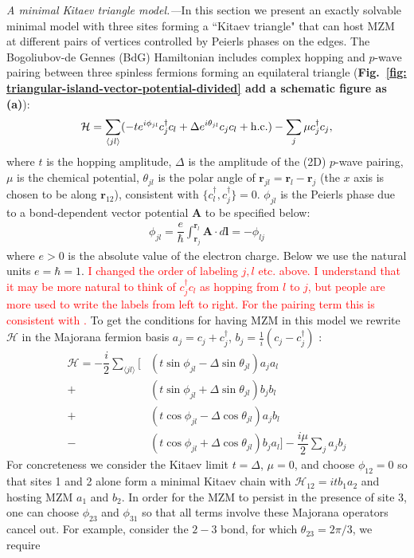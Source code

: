 \documentclass[aps,prb,showpacs,amsmath,twocolumn,amssymb,superscriptaddress]{revtex4-2}
\newcommand{\Red}[1]{\textcolor{red}{#1}}
\renewcommand{\vec}[1]{\mathbf{#1}}
\newcommand{\ham}{\mathcal{H}}
\newcommand{\cc}{c^{\dagger}}
\newcommand{\de}{\Delta}
\begin{document}
\emph{A minimal Kitaev triangle model.---}In this section we present an exactly solvable minimal model with three sites forming a ``Kitaev triangle" that can host MZM at different pairs of vertices controlled by Peierls phases on the edges. The Bogoliubov-de Gennes (BdG) Hamiltonian includes complex hopping and $p$-wave pairing between three spinless fermions forming an equilateral triangle ({\bf Fig.~\ref{fig: triangular-island-vector-potential-divided} add a schematic figure as (a)}):
\begin{equation}\label{eq:HBdG}
  \ham = \sum_{\langle j l \rangle} (-te^{i\phi_{jl}}\cc_{j} c_l + \de e^{i\theta_{jl}} c_{j} c_l + {\rm h.c.}) - \sum_{j} \mu \cc_j c_j,
\end{equation}
where $t$ is the hopping amplitude, $\de$ is the amplitude of the (2D) $p$-wave pairing, $\mu$ is the chemical potential, $\theta_{jl}$ is the polar angle of $\mathbf r_{jl} = \mathbf r_l - \mathbf r_j$ (the $x$ axis is chosen to be along $\mathbf r_{12}$), consistent with $\{c^\dag_l, c^\dag_j\} = 0$. $\phi_{jl}$ is the Peierls phase due to a bond-dependent vector potential $\mathbf A$ to be specified below: 
\begin{eqnarray}
\phi_{jl} = \dfrac{e}{\hbar} \int_{\mathbf r_j}^{\mathbf r_{l}} \vec{A} \cdot d\vec{l} = -\phi_{lj}
\end{eqnarray}
where $e>0$ is the absolute value of the electron charge. Below we use the natural units $e=\hbar=1$. \Red{I changed the order of labeling $j,l$ etc. above. I understand that it may be more natural to think of $c_j^\dag c_l$ as hopping from $l$ to $j$, but people are more used to write the labels from left to right. For the pairing term this is consistent with \cite{kitaevUnpairedMajoranaFermions2001}.} To get the conditions for having MZM in this model we rewrite $\mathcal{H}$ in the Majorana fermion basis $a_{j} = c_j + c^\dag_j$, $b_j = \frac{1}{i}(c_j - c^\dag_j)$ \cite{supp}:
\begin{align}\label{eq:H3M}
    \ham =  -\dfrac{i}{2} \sum_{\langle j l \rangle} \Big[&\left(t\sin\phi_{jl}-\de\sin\theta_{jl}\right) a_j a_l \\\nonumber
  +&\left(t\sin\phi_{jl}+\de\sin\theta_{jl}\right) b_j b_l  \\\nonumber
  +&\left(t\cos\phi_{jl} - \de\cos\theta_{jl}\right) a_j b_l  \\\nonumber
  -&\left(t\cos\phi_{jl}+\de\cos\theta_{jl}\right) b_j a_l\Big]  -\dfrac{i\mu}{2} \sum_j  a_j b_j
\end{align}
For concreteness we consider the Kitaev limit $t=\de$, $\mu=0$, and choose $\phi_{12} = 0$ so that sites 1 and 2 alone form a minimal Kitaev chain with $\mathcal{H}_{12} = itb_1a_2$ and hosting MZM $a_1$ and $b_2$. In order for the MZM to persist in the presence of site 3, one can choose $\phi_{23}$ and $\phi_{31}$ so that all terms involve these Majorana operators cancel out. For example, consider the $2-3$ bond, for which $\theta_{23} = 2\pi/3$, we require
\end{document}
